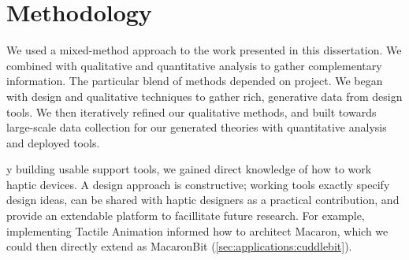 %
%
\section{Methodology}
\label{sec:rw:methodology}
We used a mixed-method approach to the work presented in this dissertation.
We combined  with qualitative and quantitative analysis to gather complementary information.
The particular blend of methods depended on  project. %
We began with design and qualitative techniques to gather rich, generative data from design tools. %
We then iteratively refined our qualitative methods, and built towards large-scale data collection for our generated theories with quantitative analysis and deployed tools.


y building usable support tools, we gained direct knowledge of how to work haptic devices.
A design approach is constructive;
working tools exactly specify design ideas, can be shared with haptic designers as a practical contribution, and provide an extendable platform to facillitate future research.
For example, implementing Tactile Animation informed how to architect Macaron, which we could then directly extend as MacaronBit (\autoref{sec:applications:cuddlebit}).


